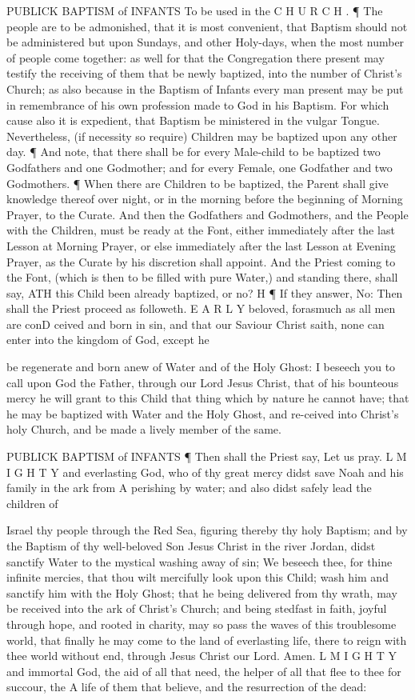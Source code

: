 PUBLICK BAPTISM of INFANTS To be used in the C H U R C H . ¶ The people are to be admonished, that it is most convenient, that Baptism should not be administered but upon Sundays, and other Holy-days, when the most number of people come together: as well for that the Congregation there present may testify the receiving of them that be newly baptized, into the number of Christ’s Church; as also because in the Baptism of Infants every man present may be put in remembrance of his own profession made to God in his Baptism. For which cause also it is expedient, that Baptism be ministered in the vulgar Tongue. Nevertheless, (if necessity so require) Children may be baptized upon any other day. ¶ And note, that there shall be for every Male-child to be baptized two Godfathers and one Godmother; and for every Female, one Godfather and two Godmothers. ¶ When there are Children to be baptized, the Parent shall give knowledge thereof over night, or in the morning before the beginning of Morning Prayer, to the Curate. And then the Godfathers and Godmothers, and the People with the Children, must be ready at the Font, either immediately after the last Lesson at Morning Prayer, or else immediately after the last Lesson at Evening Prayer, as the Curate by his discretion shall appoint. And the Priest coming to the Font, (which is then to be filled with pure Water,) and standing there, shall say, ATH this Child been already baptized, or no? H ¶ If they answer, No: Then shall the Priest proceed as followeth. E A R L Y beloved, forasmuch as all men are conD ceived and born in sin, and that our Saviour Christ saith, none can enter into the kingdom of God, except he

be regenerate and born anew of Water and of the Holy Ghost: I beseech you to call upon God the Father, through our Lord Jesus Christ, that of his bounteous mercy he will grant to this Child that thing which by nature he cannot have; that he may be baptized with Water and the Holy Ghost, and re-ceived into Christ’s holy Church, and be made a lively member of the same.

PUBLICK BAPTISM of INFANTS ¶ Then shall the Priest say, Let us pray. L M I G H T Y and everlasting God, who of thy great mercy didst save Noah and his family in the ark from A perishing by water; and also didst safely lead the children of

Israel thy people through the Red Sea, figuring thereby thy holy Baptism; and by the Baptism of thy well-beloved Son Jesus Christ in the river Jordan, didst sanctify Water to the mystical washing away of sin; We beseech thee, for thine infinite mercies, that thou wilt mercifully look upon this Child; wash him and sanctify him with the Holy Ghost; that he being delivered from thy wrath, may be received into the ark of Christ’s Church; and being stedfast in faith, joyful through hope, and rooted in charity, may so pass the waves of this troublesome world, that finally he may come to the land of everlasting life, there to reign with thee world without end, through Jesus Christ our Lord. Amen. L M I G H T Y and immortal God, the aid of all that need, the helper of all that flee to thee for succour, the A life of them that believe, and the resurrection of the dead:

